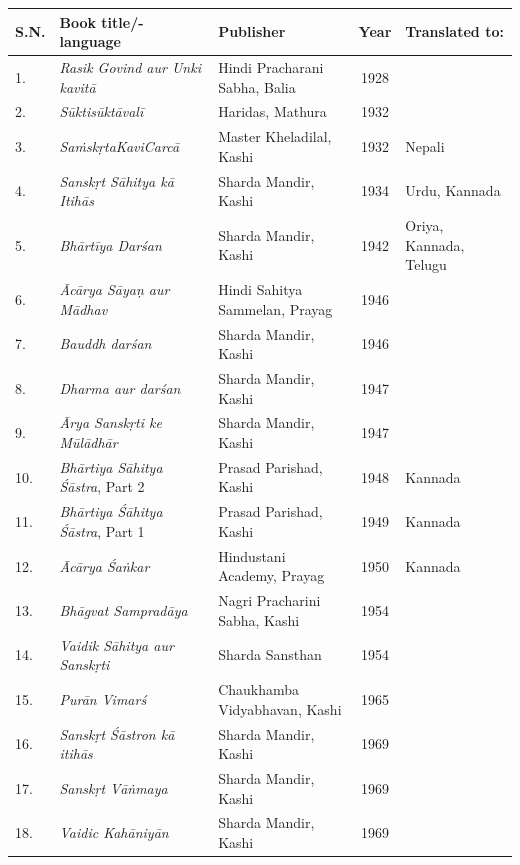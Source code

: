 \begin{longtable}{|l|p{2.9cm}|p{1.8cm}|c|p{1.6cm}|}
\hline
\textbf{S.N.} & \textbf{\centering \hspace{0.35cm} Book title/- \\ \hspace{0.7cm} language} & \textbf{Publisher} & \textbf{Year} & \textbf{Translated to:} \\
\hline
1. & \textit{Rasik Govind aur Unki kavitā} & Hindi Pracharani Sabha, Balia & 1928 &   \\
\hline
2. & \textit{Sūktisūktāvalī} & Haridas, Mathura & 1932 &   \\
\hline
3. & \textit{SaṁskṛtaKaviCarcā} & Master Kheladilal, Kashi & 1932 & Nepali \\
\hline
4. & \textit{Sanskṛt Sāhitya kā Itihās} & Sharda Mandir, Kashi & 1934 & Urdu, Kannada \\
\hline
5. & \textit{Bhārtīya Darśan} & Sharda Mandir, Kashi & 1942 & Oriya, Kannada, Telugu \\
\hline
6. & \textit{Ācārya Sāyaṇ aur Mādhav} & Hindi Sahitya Sammelan, Prayag & 1946 &   \\
\hline
7. & \textit{Bauddh darśan} & Sharda Mandir, Kashi & 1946 &   \\
\hline
8. & \textit{Dharma aur darśan} & Sharda Mandir, Kashi & 1947 &   \\
\hline
9. & \textit{Ārya Sanskṛti ke Mūlādhār} & Sharda Mandir, Kashi & 1947 &   \\
\hline
10. & \textit{Bhārtiya Sāhitya Śāstra}, Part 2 & Prasad Parishad, Kashi & 1948 & Kannada \\
\hline
11. & \textit{Bhārtiya Śāhitya Śāstra}, Part 1 & Prasad Parishad, Kashi & 1949 & Kannada \\
\hline
12. & \textit{Ācārya Śaṅkar} & Hindustani Academy, Prayag & 1950 & Kannada \\
\hline
13. & \textit{Bhāgvat Sampradāya} & Nagri Pracharini Sabha, Kashi & 1954 &   \\
\hline
14. & \textit{Vaidik Sāhitya aur Sanskṛti} & Sharda Sansthan & 1954 &   \\
\hline
15. & \textit{Purān Vimarś} & Chaukhamba Vidyabhavan, Kashi & 1965 &   \\
\hline
16. & \textit{Sanskṛt Śāstron kā itihās} & Sharda Mandir, Kashi & 1969 &   \\
\hline
17. & \textit{Sanskṛt Vāṅmaya} & Sharda Mandir, Kashi & 1969 &   \\
\hline
18. & \textit{Vaidic Kahāniyān} & Sharda Mandir, Kashi & 1969 &   \\

\end{longtable}
